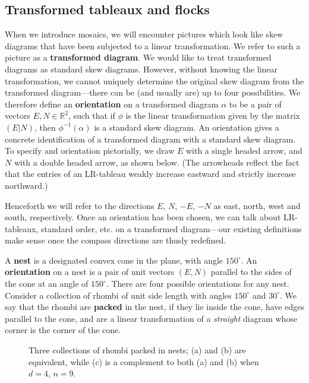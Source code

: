 \documentclass[12pt]{article}
\newcommand{\RR}{\mathbb{R}}
\begin{document}
\subsection{Transformed tableaux and flocks}
When we introduce mosaics, we will encounter pictures which look
like skew diagrams that have been subjected to a linear transformation.  
We refer to such a picture as a {\bf transformed diagram}.
We would like to treat transformed diagrams as standard skew diagrams.
However, without knowing the linear transformation, we 
cannot uniquely determine the original skew diagram from the
transformed diagram---there can be (and usually are) up to four 
possibilities.  We therefore define an {\bf orientation} 
on a transformed diagram $\alpha$ to be a pair of vectors 
$E,N \in \RR^2$, such that if 
$\phi$ is the linear transformation given by the 
matrix $(E|N)$, then $\phi^{-1}(\alpha)$ is a standard skew diagram.  
An orientation gives a concrete identification of a transformed diagram
with a standard skew diagram.  To specify and orientation pictorially, 
we draw $E$ with a single headed 
arrow, and $N$ with a double headed arrow, as shown below.
(The arrowheads reflect the fact that the entries of an LR-tableau
weakly increase eastward and strictly increase northward.)
\centerline{}
Henceforth we will refer to the directions $E$, $N$, $-E$, $-N$ as east,
north, west and south, respectively.  Once an orientation has been chosen,
we can talk about LR-tableaux, standard order, etc. 
on a transformed diagram---our existing definitions make sense once
the compass directions are thusly redefined.

A {\bf nest} is a designated convex cone in the plane, with 
angle $150^\circ$.
An {\bf orientation} on a nest is a pair of unit vectors $(E,N)$ parallel
to the sides of the cone at an angle of $150^\circ$.  There are
four possible orientations for any nest.
Consider a collection of rhombi of unit side length
with angles $150^\circ$ and $30^\circ$.  We say that the rhombi
are {\bf packed} in the nest, if they lie inside the cone, have
edges parallel to the cone, and are a linear transformation
of a {\em straight} diagram whose corner is the corner of the cone.

%
\begin{figure}[htbp]
\begin{center}
\caption{Three collections of rhombi packed in nests; (a) and (b)
are equivalent, while (c) is a complement to both (a) and (b)
when $d=4$, $n=9$.}
\label{fig:equivcomp}
\end{center}
\end{figure}
%
\end{document}
